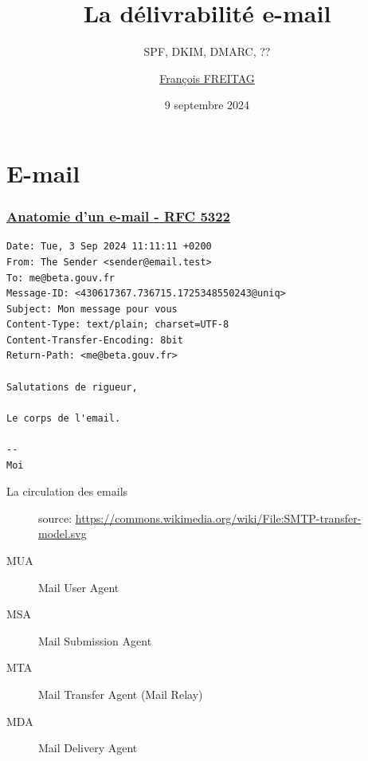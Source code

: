 \documentclass{beamer}
\title{La délivrabilité e-mail}
\subtitle{SPF, DKIM, DMARC, ??}
\author{\href{mailto:mail@franek.fr}{François FREITAG}}
\institute{Les emplois de l'inclusion \\ GIP Inclusion}
\date{9 septembre 2024}
\begin{document}

\begin{frame}
	\maketitle %
\end{frame}


\section{E-mail} %

\begin{frame}[fragile]
    \frametitle{\href{https://datatracker.ietf.org/doc/html/rfc5322}{Anatomie d'un e-mail - RFC 5322}}

    \begin{verbatim}
Date: Tue, 3 Sep 2024 11:11:11 +0200
From: The Sender <sender@email.test>
To: me@beta.gouv.fr
Message-ID: <430617367.736715.1725348550243@uniq>
Subject: Mon message pour vous
Content-Type: text/plain; charset=UTF-8
Content-Transfer-Encoding: 8bit
Return-Path: <me@beta.gouv.fr>

Salutations de rigueur,

Le corps de l'email.

--
Moi
    \end{verbatim}
\end{frame}

\begin{frame}{La circulation des emails}
    \begin{figure}[b]
        
        \caption{source: \href{https://commons.wikimedia.org/wiki/File:SMTP-transfer-model.svg}{https://commons.wikimedia.org/wiki/File:SMTP-transfer-model.svg}}
    \end{figure}

    \begin{description}
        \item[MUA] Mail User Agent
        \item[MSA] Mail Submission Agent
        \item[MTA] Mail Transfer Agent (Mail Relay)
        \item[MDA] Mail Delivery Agent
    \end{description}
\end{frame}
\end{document}
